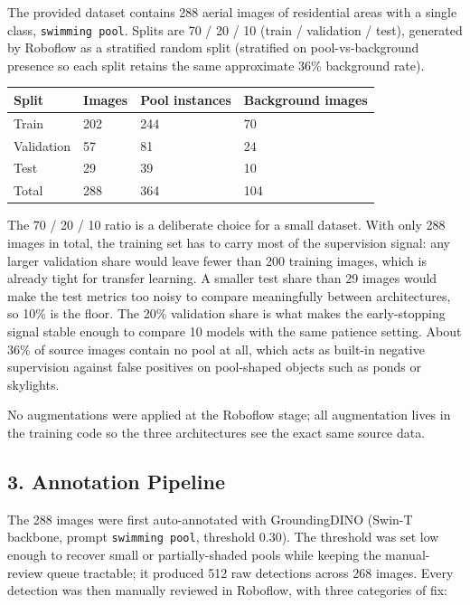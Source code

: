 \documentclass[11pt
]{article}
\newcounter{none} %
\begin{document}
The provided dataset contains 288 aerial images of residential areas
with a single class, \texttt{swimming\ pool}. Splits are 70 / 20 / 10
(train / validation / test), generated by Roboflow as a stratified
random split (stratified on pool-vs-background presence so each split
retains the same approximate 36\% background rate).

{\def\LTcaptype{none} %
\begin{longtable}[]{@{}llll@{}}
\toprule\noalign{}
Split & Images & Pool instances & Background images \\
\midrule\noalign{}
\endhead
\bottomrule\noalign{}
\endlastfoot
Train & 202 & 244 & 70 \\
Validation & 57 & 81 & 24 \\
Test & 29 & 39 & 10 \\
Total & 288 & 364 & 104 \\
\end{longtable}
}

The 70 / 20 / 10 ratio is a deliberate choice for a small dataset. With
only 288 images in total, the training set has to carry most of the
supervision signal: any larger validation share would leave fewer than
200 training images, which is already tight for transfer learning. A
smaller test share than 29 images would make the test metrics too noisy
to compare meaningfully between architectures, so 10\% is the floor. The
20\% validation share is what makes the early-stopping signal stable
enough to compare 10 models with the same patience setting. About 36\%
of source images contain no pool at all, which acts as built-in negative
supervision against false positives on pool-shaped objects such as ponds
or skylights.

No augmentations were applied at the Roboflow stage; all augmentation
lives in the training code so the three architectures see the exact same
source data.

\subsection{3. Annotation Pipeline}\label{annotation-pipeline}

The 288 images were first auto-annotated with GroundingDINO (Swin-T
backbone, prompt \texttt{swimming\ pool}, threshold 0.30). The
threshold was set low enough to recover small or partially-shaded
pools while keeping the manual-review queue tractable; it produced
512 raw detections across 268 images. Every detection was then
manually reviewed in Roboflow, with three categories of fix:
\end{document}
